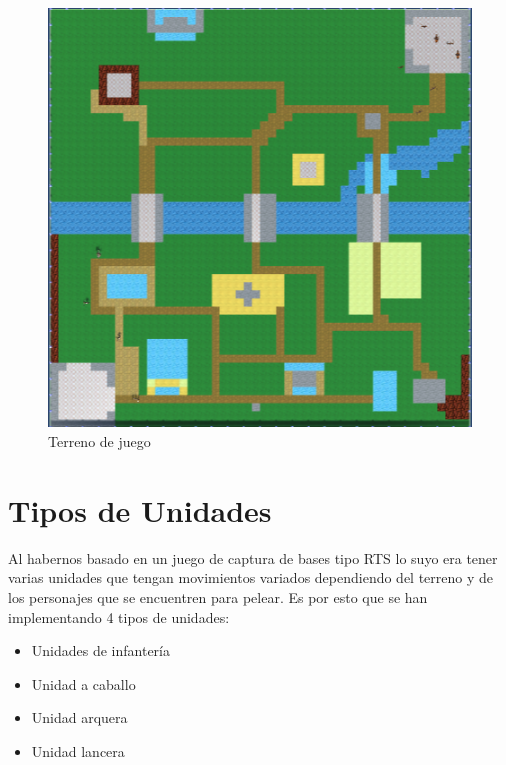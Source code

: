 
\begin{figure}[H]
    \centering
    \includegraphics[scale=0.7]{images/Mapa.png}
    \caption{Terreno de juego}
    \label{fig:mapa}
\end{figure}

\section{Tipos de Unidades}

Al habernos basado en un juego de captura de bases tipo RTS lo suyo era tener varias unidades que tengan movimientos variados dependiendo del terreno y de los personajes que se encuentren para pelear. Es por esto que se han implementando 4 tipos de unidades:

\begin{multicols}{2}
    \begin{itemize}
        \item Unidades de infantería
        \item Unidad a caballo
        \item Unidad arquera
        \item Unidad lancera
    \end{itemize}
\end{multicols}

